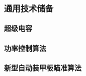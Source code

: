 \subsubsection{通用技术储备}
    
    \paragraph{超级电容}
    
    \paragraph{功率控制算法}

    \paragraph{新型自动装甲板瞄准算法}